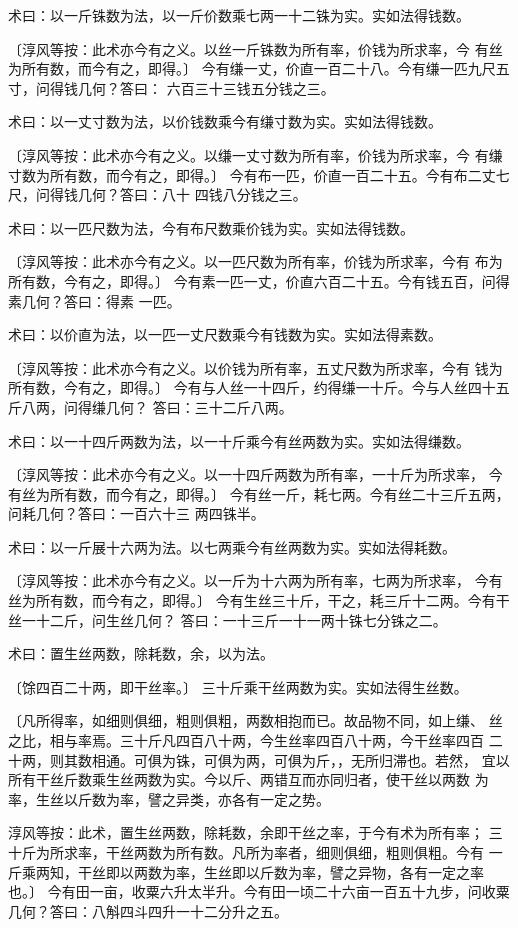 \documentclass[a4paper,12pt,UTF8,twoside]{ctexbook}
\begin{document}
术曰：以一斤铢数为法，以一斤价数乘七两一十二铢为实。实如法得钱数。

〔淳风等按：此术亦今有之义。以丝一斤铢数为所有率，价钱为所求率，今 有丝为所有数，而今有之，即得。〕 今有缣一丈，价直一百二十八。今有缣一匹九尺五寸，问得钱几何？答曰： 六百三十三钱五分钱之三。

术曰：以一丈寸数为法，以价钱数乘今有缣寸数为实。实如法得钱数。

〔淳风等按：此术亦今有之义。以缣一丈寸数为所有率，价钱为所求率，今 有缣寸数为所有数，而今有之，即得。〕 今有布一匹，价直一百二十五。今有布二丈七尺，问得钱几何？答曰：八十 四钱八分钱之三。

术曰：以一匹尺数为法，今有布尺数乘价钱为实。实如法得钱数。

〔淳风等按：此术亦今有之义。以一匹尺数为所有率，价钱为所求率，今有 布为所有数，今有之，即得。〕 今有素一匹一丈，价直六百二十五。今有钱五百，问得素几何？答曰：得素 一匹。

术曰：以价直为法，以一匹一丈尺数乘今有钱数为实。实如法得素数。

〔淳风等按：此术亦今有之义。以价钱为所有率，五丈尺数为所求率，今有 钱为所有数，今有之，即得。〕 今有与人丝一十四斤，约得缣一十斤。今与人丝四十五斤八两，问得缣几何？ 答曰：三十二斤八两。

术曰：以一十四斤两数为法，以一十斤乘今有丝两数为实。实如法得缣数。

〔淳风等按：此术亦今有之义。以一十四斤两数为所有率，一十斤为所求率， 今有丝为所有数，而今有之，即得。〕 今有丝一斤，耗七两。今有丝二十三斤五两，问耗几何？答曰：一百六十三 两四铢半。

术曰：以一斤展十六两为法。以七两乘今有丝两数为实。实如法得耗数。

〔淳风等按：此术亦今有之义。以一斤为十六两为所有率，七两为所求率， 今有丝为所有数，而今有之，即得。〕 今有生丝三十斤，干之，耗三斤十二两。今有干丝一十二斤，问生丝几何？ 答曰：一十三斤一十一两十铢七分铢之二。

术曰：置生丝两数，除耗数，余，以为法。

〔馀四百二十两，即干丝率。〕 三十斤乘干丝两数为实。实如法得生丝数。

〔凡所得率，如细则俱细，粗则俱粗，两数相抱而已。故品物不同，如上缣、 丝之比，相与率焉。三十斤凡四百八十两，今生丝率四百八十两，今干丝率四百 二十两，则其数相通。可俱为铢，可俱为两，可俱为斤，，无所归滞也。若然， 宜以所有干丝斤数乘生丝两数为实。今以斤、两错互而亦同归者，使干丝以两数 为率，生丝以斤数为率，譬之异类，亦各有一定之势。

淳风等按：此术，置生丝两数，除耗数，余即干丝之率，于今有术为所有率； 三十斤为所求率，干丝两数为所有数。凡所为率者，细则俱细，粗则俱粗。今有 一斤乘两知，干丝即以两数为率，生丝即以斤数为率，譬之异物，各有一定之率 也。〕 今有田一亩，收粟六升太半升。今有田一顷二十六亩一百五十九步，问收粟 几何？答曰：八斛四斗四升一十二分升之五。
\end{document}
